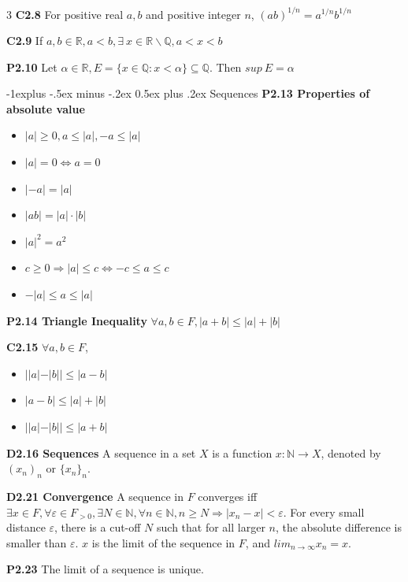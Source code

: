 \documentclass[10pt, landscape]{article}
\makeatletter
\renewcommand{\section}{\@startsection{section}{1}{0mm}%
                                {-1ex plus -.5ex minus -.2ex}%
                                {0.5ex plus .2ex}%
                                {\normalfont\large\bfseries}}
\renewcommand{\section}{\@startsection{section}{2}{0mm}%
                                {-1explus -.5ex minus -.2ex}%
                                {0.5ex plus .2ex}%
                                {\normalfont\normalsize\bfseries}}
\makeatother
\begin{document}
\begin{multicols*}{3}
\textbf{C2.8} For positive real $a,b$ and positive integer $n$, $(ab)^{1/n}=a^{1/n}b^{1/n}$

\textbf{C2.9} If $a,b \in \mathbb{R}, a<b, \exists \ x \in \mathbb{R} \backslash \mathbb{Q}, a<x<b$

\textbf{P2.10} Let $\alpha \in \mathbb{R}, E=\{x \in \mathbb{Q}: x < \alpha\} \subseteq \mathbb{Q}$. Then $sup \ E = \alpha$

\section{Sequences}
\textbf{P2.13 Properties of absolute value}
\begin{itemize}
    \item $|a| \geq 0, a \leq |a|, -a \leq |a|$
    \item $|a|=0 \Leftrightarrow a = 0$
    \item $|-a|=|a|$
    \item $|ab|=|a|\cdot |b|$
    \item $|a|^2=a^2$
    \item $c \geq 0 \Rightarrow |a| \leq c \Leftrightarrow -c \leq a \leq c$
    \item $-|a| \leq a \leq |a|$
\end{itemize}

\textbf{P2.14 Triangle Inequality} $\forall a, b \in F, |a+b| \leq |a|+|b|$

\textbf{C2.15} $\forall a, b \in F$,
\begin{itemize}
    \item $||a|-|b|| \leq |a-b|$
    \item $|a-b| \leq |a|+|b|$
    \item $||a|-|b|| \leq |a+b|$
\end{itemize}

\textbf{D2.16 Sequences} A sequence in a set $X$ is a function $x:\mathbb{N}\rightarrow X$, denoted by $(x_n)_n$ or $\{x_n\}_n$.

\textbf{D2.21 Convergence} A sequence in $F$ converges iff $\exists x \in F, \forall \varepsilon \in F_{>0}, \exists N \in \mathbb{N}, \forall n \in \mathbb{N}, n \geq N \Rightarrow |x_n-x| < \varepsilon$. For every small distance $\varepsilon$, there is a cut-off $N$ such that for all larger $n$, the absolute difference is smaller than $\varepsilon$. $x$ is the limit of the sequence in $F$, and $lim_{n\rightarrow\infty}x_n=x$.

\textbf{P2.23} The limit of a sequence is unique.


\end{multicols*}
\end{document}
